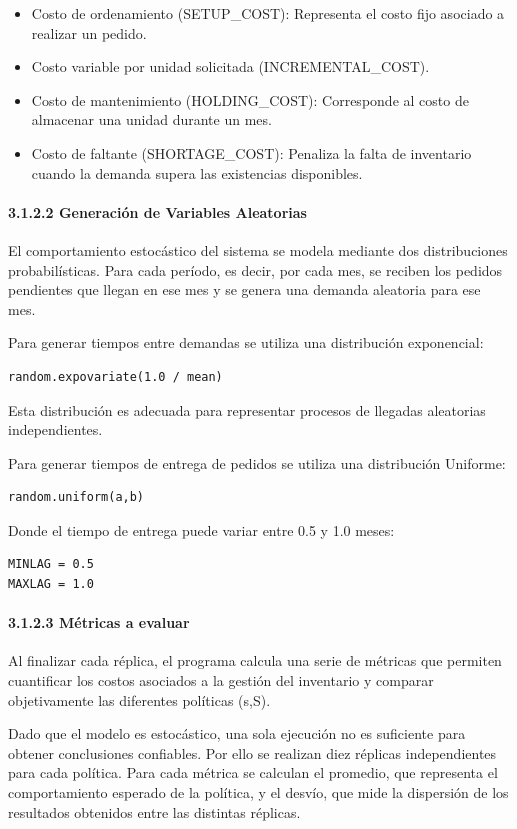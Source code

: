 \documentclass{article}
\begin{document}
\begin{itemize}
    \item Costo de ordenamiento (SETUP\_COST): Representa el costo fijo asociado a realizar un pedido.
    \item Costo variable por unidad solicitada (INCREMENTAL\_COST).
    \item Costo de mantenimiento (HOLDING\_COST): Corresponde al costo de almacenar una unidad durante un mes.
    \item Costo de faltante (SHORTAGE\_COST): Penaliza la falta de inventario cuando la demanda supera las existencias disponibles.
\end{itemize}

\paragraph{3.1.2.2 Generación de Variables Aleatorias}
El comportamiento estocástico del sistema se modela mediante dos distribuciones probabilísticas. Para cada período, es decir, por cada mes, se reciben los pedidos pendientes que llegan en ese mes y se genera una demanda aleatoria para ese mes.

Para generar tiempos entre demandas se utiliza una distribución exponencial:
\begin{verbatim}
random.expovariate(1.0 / mean)
\end{verbatim}
Esta distribución es adecuada para representar procesos de llegadas aleatorias independientes.

Para generar tiempos de entrega de pedidos se utiliza una distribución Uniforme:
\begin{verbatim}
random.uniform(a,b)
\end{verbatim}
Donde el tiempo de entrega puede variar entre 0.5 y 1.0 meses:
\begin{verbatim}
MINLAG = 0.5
MAXLAG = 1.0
\end{verbatim}

\paragraph{3.1.2.3 Métricas a evaluar}
Al finalizar cada réplica, el programa calcula una serie de métricas que permiten cuantificar los costos asociados a la gestión del inventario y comparar objetivamente las diferentes políticas (s,S).

Dado que el modelo es estocástico, una sola ejecución no es suficiente para obtener conclusiones confiables. Por ello se realizan diez réplicas independientes para cada política. Para cada métrica se calculan el promedio, que representa el comportamiento esperado de la política, y el desvío, que mide la dispersión de los resultados obtenidos entre las distintas réplicas.
\end{document}
